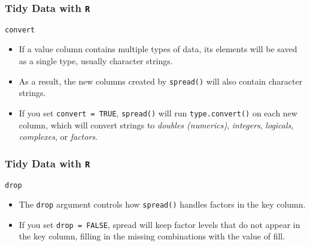 \documentclass[TIDYMASTER.tex]{subfiles}
\begin{document}
\begin{frame}[fragile]
	\frametitle{Tidy Data with \texttt{R}}
	\Large
\texttt{convert}
\begin{itemize}
	\item If a value column contains multiple types of data, its elements will be saved as a single type, usually character strings. 
	\item As a result, the new columns created by \texttt{spread()} will also contain character strings.
	\item  If you set \texttt{convert = TRUE}, \texttt{spread()} will run \texttt{type.convert()} on each new column, which will convert strings to \textit{doubles (numerics)}, \textit{integers}, \textit{logicals}, \textit{complexes}, or \textit{factors}.
	\end{itemize}
\end{frame}
\begin{frame}[fragile]
	\frametitle{Tidy Data with \texttt{R}}
	\Large
\vspace{-1cm}
	\texttt{drop} 
\begin{itemize}
\item The \texttt{drop} argument controls how \texttt{spread()} handles factors in the key column. 
\item If you set \texttt{drop = FALSE}, spread will keep factor levels that do not appear in the key column, filling in the missing combinations with the value of fill.
\end{itemize}
\end{frame}
\end{document}
